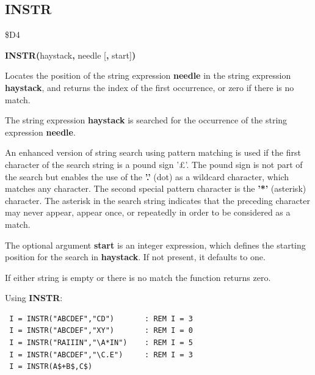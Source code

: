 \subsection{INSTR}
\begin{description}[leftmargin=2cm,style=nextline]
\item [Token:] \$D4
\item [Format:] {\bf INSTR(}haystack{\bf,} needle [{\bf,} start]{\bf)}
\item [Usage:] Locates the
               position of the string expression {\bf needle}
               in the string expression {\bf haystack}, and
               returns the index of the first occurrence,
               or zero if there is no match.

               The string expression {\bf haystack}
               is searched for the occurrence of the
               string expression
               {\bf needle}.

               An enhanced version of string search using pattern
               matching is used if the first character of
               the search string is a pound sign '£'.
               The pound sign is not part of the search but enables the use
               of the {\bf '.'} (dot) as a wildcard character, which matches any
               character. The second special pattern character is
               the {\bf '*'} (asterisk) character. The asterisk in the search string indicates
               that the preceding character may never appear, appear once, or repeatedly
               in order to be considered as a match.

               The optional argument {\bf start} is an integer
               expression, which defines the starting position
               for the search in {\bf haystack}. If not present,
               it defaults to one.

\item [Remarks:] If either string is empty or there is no match
               the function returns zero.

\item [Examples:] Using {\bf INSTR}:
\begin{tcolorbox}[colback=black,coltext=white]
\verbatimfont{\codefont}
\begin{verbatim}
 I = INSTR("ABCDEF","CD")       : REM I = 3
 I = INSTR("ABCDEF","XY")       : REM I = 0
 I = INSTR("RAIIIN","\A*IN")    : REM I = 5
 I = INSTR("ABCDEF","\C.E")     : REM I = 3
 I = INSTR(A$+B$,C$)
\end{verbatim}
\end{tcolorbox}
\end{description}

